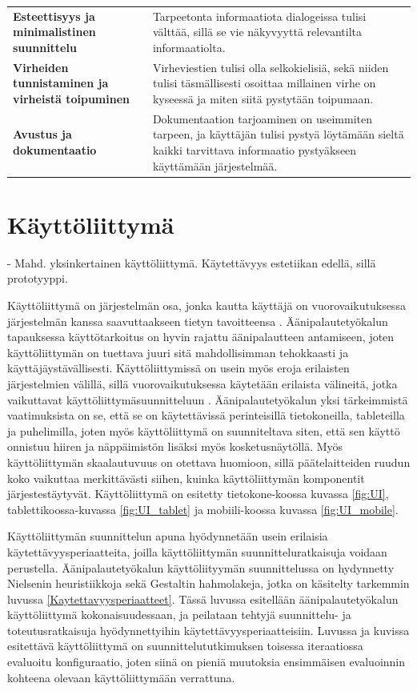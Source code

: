 \documentclass[utf8]{gradu3}
\begin{document}
\begin{table}[H]
\begin{tabular}{p{12.355em}p{21.855em}}
    \textbf{Esteettisyys ja minimalistinen suunnittelu} & Tarpeetonta informaatiota dialogeissa tulisi välttää, sillä se vie näkyvyyttä relevantilta informaatiolta. \\
    \textbf{Virheiden tunnistaminen ja virheistä toipuminen} & Virheviestien tulisi olla selkokielisiä, sekä niiden tulisi täsmällisesti osoittaa millainen virhe on kyseessä ja miten siitä pystytään toipumaan. \\
    \textbf{Avustus ja dokumentaatio} & Dokumentaation tarjoaminen on useimmiten tarpeen, ja käyttäjän tulisi pystyä löytämään sieltä kaikki tarvittava informaatio pystyäkseen käyttämään järjestelmää. \\
    \end{tabular}%
  \label{tab:addlabel}%
\end{table}%


\section{Käyttöliittymä}
\label{Kayttoliittyma}

- Mahd. yksinkertainen käyttöliittymä. Käytettävyys estetiikan edellä, sillä prototyyppi.

Käyttöliittymä on järjestelmän osa, jonka kautta käyttäjä on vuorovaikutuksessa järjestelmän kanssa saavuttaakseen tietyn tavoitteensa \parencite[][]{stone}. Äänipalautetyökalun tapauksessa käyttötarkoitus on hyvin rajattu äänipalautteen antamiseen, joten käyttöliittymän on tuettava juuri sitä mahdollisimman tehokkaasti ja käyttäjäystävällisesti.  Käyttöliittymissä on usein myös eroja erilaisten järjestelmien välillä, sillä vuorovaikutuksessa käytetään erilaista välineitä, jotka vaikuttavat käyttöliittymäsuunnitteluun \parencite[][]{stone}. Äänipalautetyökalun yksi tärkeimmistä vaatimuksista on se, että se on käytettävissä perinteisillä tietokoneilla, tableteilla ja puhelimilla, joten myös käyttöliittymä on suunniteltava siten, että sen käyttö onnistuu hiiren ja näppäimistön lisäksi myös kosketusnäytöllä. Myös käyttöliittymän skaalautuvuus on otettava huomioon, sillä päätelaitteiden ruudun koko vaikuttaa merkittävästi siihen, kuinka käyttöliittymän komponentit järjestestäytyvät. Käyttöliittymä on esitetty tietokone-koossa kuvassa \ref{fig:UI}, tablettikoossa-kuvassa \ref{fig:UI_tablet} ja mobiili-koossa kuvassa \ref{fig:UI_mobile}.

Käyttöliittymän suunnittelun apuna hyödynnetään usein erilaisia käytettävyysperiaatteita, joilla käyttöliittymän suunnitteluratkaisuja voidaan perustella. Äänipalautetyökalun käyttöliityymän suunnittelussa on hydynnetty Nielsenin heuristiikkoja sekä Gestaltin hahmolakeja, jotka on käsitelty tarkemmin luvussa \ref{Kaytettavyysperiaatteet}. Tässä luvussa esitellään äänipalautetyökalun käyttöliittymä kokonaisuudessaan, ja peilataan tehtyjä suunnittelu- ja toteutusratkaisuja hyödynnettyihin käytettävyysperiaatteisiin. Luvussa ja kuvissa esitettävä käyttöliittymä on suunnittelututkimuksen toisessa iteraatiossa evaluoitu konfiguraatio, joten siinä on pieniä muutoksia ensimmäisen evaluoinnin kohteena olevaan käyttöliittymään verrattuna. 
\end{document}
